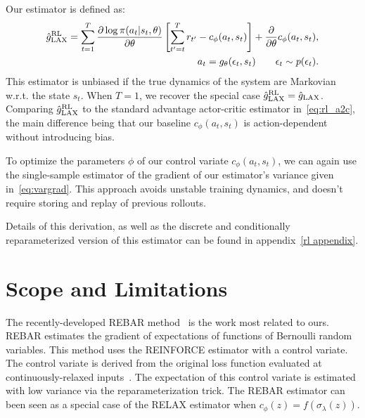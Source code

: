 \documentclass{article}
\newcommand{\LL}[1]{\frac{\partial \log \pi(a_{#1}| s_{#1}, \theta)}{\partial \theta}}
\newcommand{\YW}[1]{{\color{red} \bf [[YW: #1]]}}
\newcommand{\LAX}{{\textnormal{LAX}}}
\newcommand{\RL}{{\textnormal{RL}}}
\begin{document}
Our estimator is defined as: 
%
\begin{align}
\hat g_\LAX^{\RL} = \sum_{t=1}^T \LL{t} \left[ \sum_{t'=t}^T r_{t'} - c_\phi(a_t,s_t) \right] +\frac{\partial}{\partial\theta} c_\phi(a_t, s_t), \\
a_t = g_\theta(\epsilon_t,s_t) \qquad \epsilon_t \sim p(\epsilon_t)\nonumber.
\label{eq:rl_est}
\end{align}
%
This estimator is unbiased if the true dynamics of the system are Markovian w.r.t. the state $s_t$.
When $T = 1$, we recover the special case ${\hat g_\LAX^{\RL} = \hat g_\LAX}$.
Comparing $\hat g_\LAX^{\RL}$ to the standard advantage actor-critic estimator in~\eqref{eq:rl_a2c}, the main difference being that our baseline $c_\phi(a_t, s_t)$ is action-dependent without introducing bias.

To optimize the parameters $\phi$ of our control variate $c_\phi(a_t, s_t)$, we can again use the single-sample estimator of the gradient of our estimator's variance given in~\eqref{eq:vargrad}.
This approach avoids unstable training dynamics, and doesn't require storing and replay of previous rollouts.

Details of this derivation, as well as the discrete and conditionally reparameterized version of this estimator can be found in appendix~\ref{rl appendix}.

\section{Scope and Limitations}
\label{limitations}
The recently-developed REBAR method~\citep{tucker2017rebar} is the work most related to ours.
REBAR estimates the gradient of expectations of functions of Bernoulli random variables.
This method uses the REINFORCE estimator with a control variate.
The control variate is derived from the original loss function evaluated at continuously-relaxed inputs~\citep{maddison2016concrete, jang2016categorical}.
The expectation of this control variate is estimated with low variance via the reparameterization trick.
The REBAR estimator can been seen as a special case of the RELAX estimator when ${c_\phi(z) = f(\sigma_\lambda(z))}$.
\end{document}
